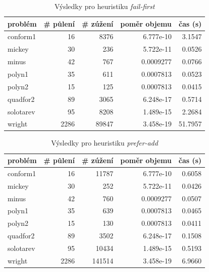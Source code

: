 {\begin{table}[H]
\centering
\begin{tabular}{lrrrr}
\hline
problém & \# půlení & \# zúžení & poměr objemu & čas (s) \\ \hline
conform1 & 16 & 8376 & 6.777e-10 & 3.1547 \\
mickey & 30 & 236 & 5.722e-11 & 0.0526 \\
minus & 42 & 767 & 0.0009277 & 0.0766 \\
polyn1 & 35 & 611 & 0.0007813 & 0.0523 \\
polyn2 & 15 & 125 & 0.0007813 & 0.0415 \\
quadfor2 & 89 & 3065 & 6.248e-17 & 0.5714 \\
solotarev & 95 & 8208 & 1.489e-15 & 2.2684 \\
wright & 2286 & 89847 & 3.458e-19 & 51.7957 \\
\end{tabular}
\caption{Výsledky pro heuristiku \emph{fail-first}}
\label{fail-first}
\end{table}



\begin{table}[H]
\centering
\begin{tabular}{lrrrr}
\hline
problém & \# půlení & \# zúžení & poměr objemu & čas (s) \\ \hline
conform1 & 16 & 11787 & 6.777e-10 & 0.6058 \\
mickey & 30 & 252 & 5.722e-11 & 0.0426 \\
minus & 42 & 760 & 0.0009277 & 0.0507 \\
polyn1 & 35 & 639 & 0.0007813 & 0.0465 \\
polyn2 & 15 & 130 & 0.0007813 & 0.0411 \\
quadfor2 & 89 & 3502 & 6.248e-17 & 0.1508 \\
solotarev & 95 & 10434 & 1.489e-15 & 0.5193 \\
wright & 2286 & 141514 & 3.458e-19 & 6.9660 \\
\end{tabular}
\caption{Výsledky pro heuristiku \emph{prefer-add}}
\label{prefer-add}
\end{table}



}
